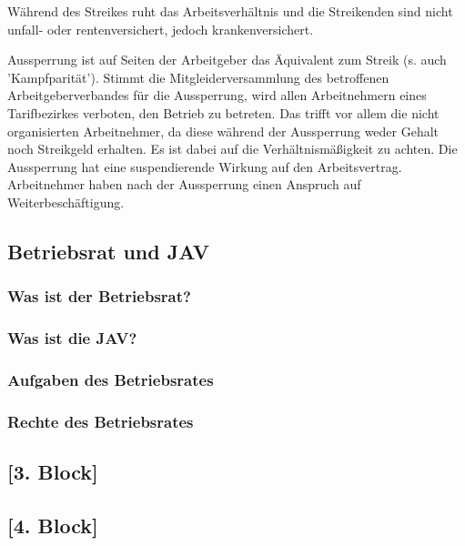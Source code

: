 Während des Streikes ruht das Arbeitsverhältnis und die Streikenden sind nicht unfall- oder rentenversichert, jedoch krankenversichert.

Aussperrung ist auf Seiten der Arbeitgeber das Äquivalent zum Streik (s. auch 'Kampfparität'). Stimmt die Mitgleiderversammlung des betroffenen Arbeitgeberverbandes für die Aussperrung, wird allen Arbeitnehmern eines Tarifbezirkes verboten, den Betrieb zu betreten. Das trifft vor allem die nicht organisierten Arbeitnehmer, da diese während der Aussperrung weder Gehalt noch Streikgeld erhalten. Es ist dabei auf die Verhältnismäßigkeit zu achten. Die  Aussperrung hat eine suspendierende Wirkung auf den Arbeitsvertrag. Arbeitnehmer haben nach der Aussperrung einen Anspruch auf Weiterbeschäftigung.

\subsection{Betriebsrat und JAV}

\subsubsection{Was ist der Betriebsrat?}
\subsubsection{Was ist die JAV?}
\subsubsection{Aufgaben des Betriebsrates}
\subsubsection{Rechte des Betriebsrates}

\subsection{[3. Block]}
\subsection{[4. Block]}